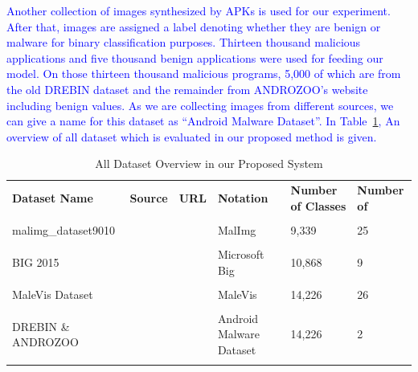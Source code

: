 \documentclass[pdflatex,sn-mathphys]{sn-jnl}%
\begin{document}
 \textcolor{blue}{Another collection of images synthesized by APKs is used for our experiment. After that, images are assigned a label denoting whether they are benign or malware for binary classification purposes. Thirteen thousand malicious applications and five thousand benign applications were used for feeding our model. On those  thirteen thousand malicious programs, 5,000 of which are from the old DREBIN\cite{45} dataset and the remainder from ANDROZOO's \cite{44} website including benign values. As we are collecting images from different sources, we can give a name for this dataset as ``Android Malware Dataset''. In Table~\ref{dataset}, An overview of all dataset which is evaluated in our proposed method is given.}
 	\begin{table}[tb]
         \centering
		 \caption{All Dataset Overview in our Proposed System}
		 \begin{tabular}{|p{2.5cm}||p{0.9cm}||p{1cm}||p{1.2cm}||p{1cm}||p{1.2cm}|}
			\midrule
			\textbf{Dataset Name} & \textbf{Source} & \textbf{URL} & \textbf{Notation} & \textbf{Number of Classes} & \textbf{Number of \text{Samples}}\\\\
			  \midrule
			malimg\_dataset9010  &  \cite{11} & \cite{81}  & MalImg & 9,339 & 25 \\\\
		
			BIG 2015 & \cite{10} & \cite{82} & Microsoft Big & 10,868 & 9 \\\\
			
			MaleVis Dataset & \cite{39} & \cite{83} & MaleVis & 14,226 & 26 \\\\
	
			DREBIN \& ANDROZOO &  \cite{44} \cite{45}  & \cite{84} \cite{85} & Android Malware Dataset & 14,226 & 2 \\\\
			\hline
		\end{tabular}
	
		\label{dataset}
  \vspace{-4mm}
	\end{table}
\end{document}
